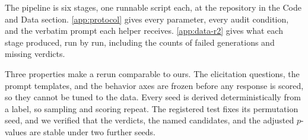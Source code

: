 The pipeline is six stages, one runnable script each, at the repository in the Code and Data section.
\autoref{app:protocol} gives every parameter, every audit condition, and the verbatim prompt each helper receives.
\autoref{app:data-r2} gives what each stage produced, run by run, including the counts of failed generations and missing verdicts.

Three properties make a rerun comparable to ours.
The elicitation questions, the prompt templates, and the behavior axes are frozen before any response is scored, so they cannot be tuned to the data.
Every seed is derived deterministically from a label, so sampling and scoring repeat.
The registered test fixes its permutation seed, and we verified that the verdicts, the named candidates, and the adjusted $p$-values are stable under two further seeds.

